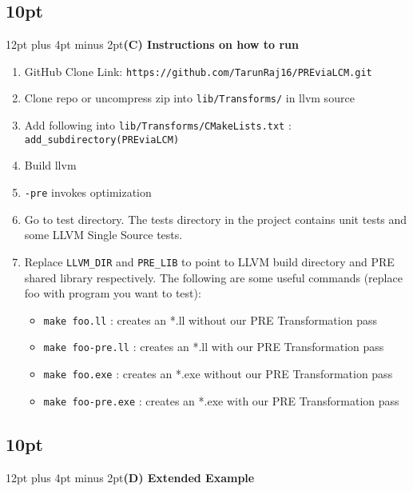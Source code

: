 \documentclass[onecolumn,10pt]{journal}
\begin{document}
\titlespacing\subsection*{10pt}{12pt plus 4pt minus 2pt}\textbf{(C) Instructions on how to run}
\begin{enumerate}
\item GitHub Clone Link: \texttt{https://github.com/TarunRaj16/PREviaLCM.git}

\item Clone repo or uncompress zip into \texttt{lib/Transforms/} in llvm source

\item Add following into \texttt{lib/Transforms/CMakeLists.txt} : \texttt{add\_subdirectory(PREviaLCM)}

\item Build llvm

\item \texttt{-pre} invokes optimization

\item Go to test directory. The tests directory in the project contains unit tests and some LLVM Single Source tests. 

\item Replace \texttt{LLVM\_DIR} and \texttt{PRE\_LIB} to point to LLVM build directory and PRE shared library respectively. The following are some useful commands (replace foo with program you want to test):

\begin{itemize}
\item \texttt{make foo.ll} : creates an *.ll without our PRE Transformation pass
\item \texttt{make foo-pre.ll} : creates an *.ll with our PRE Transformation pass
\item \texttt{make foo.exe} : creates an *.exe without our PRE Transformation pass
\item \texttt{make foo-pre.exe} : creates an *.exe with our PRE Transformation pass
\end{itemize}

\end{enumerate}
\pagebreak
\titlespacing\subsection*{10pt}{12pt plus 4pt minus 2pt}\textbf{(D) Extended Example}
\end{document}
